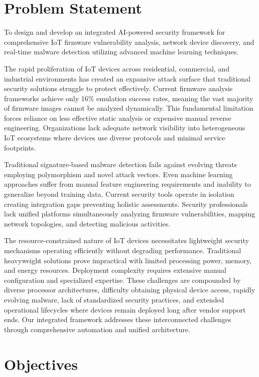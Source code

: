 \section{Problem Statement}

To design and develop an integrated AI-powered security framework for comprehensive IoT firmware vulnerability analysis, network device discovery, and real-time malware detection utilizing advanced machine learning techniques.

The rapid proliferation of IoT devices across residential, commercial, and industrial environments has created an expansive attack surface that traditional security solutions struggle to protect effectively. Current firmware analysis frameworks achieve only 16\% emulation success rates, meaning the vast majority of firmware images cannot be analyzed dynamically. This fundamental limitation forces reliance on less effective static analysis or expensive manual reverse engineering. Organizations lack adequate network visibility into heterogeneous IoT ecosystems where devices use diverse protocols and minimal service footprints.

Traditional signature-based malware detection fails against evolving threats employing polymorphism and novel attack vectors. Even machine learning approaches suffer from manual feature engineering requirements and inability to generalize beyond training data. Current security tools operate in isolation creating integration gaps preventing holistic assessments. Security professionals lack unified platforms simultaneously analyzing firmware vulnerabilities, mapping network topologies, and detecting malicious activities.

The resource-constrained nature of IoT devices necessitates lightweight security mechanisms operating efficiently without degrading performance. Traditional heavyweight solutions prove impractical with limited processing power, memory, and energy resources. Deployment complexity requires extensive manual configuration and specialized expertise. These challenges are compounded by diverse processor architectures, difficulty obtaining physical device access, rapidly evolving malware, lack of standardized security practices, and extended operational lifecycles where devices remain deployed long after vendor support ends. Our integrated framework addresses these interconnected challenges through comprehensive automation and unified architecture.

\section{Objectives}


